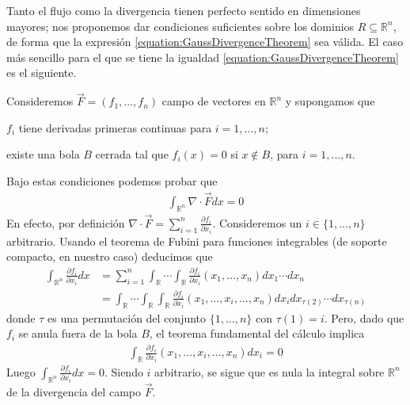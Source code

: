 \documentclass{report}
\newcommand{\realNumbers}{\mathbb{R}}
\theoremstyle{definition}
\theoremstyle{remark}
\begin{document}
  Tanto el flujo como la divergencia tienen perfecto sentido en dimensiones mayores;
  nos proponemos dar condiciones suficientes sobre los dominios \(R \subseteq \realNumbers^n\), de forma que la expresión \eqref{equation:GaussDivergenceTheorem} sea válida.
  El caso más sencillo para el que se tiene la igualdad \eqref{equation:GaussDivergenceTheorem} es el siguiente.

  Consideremos \(\vec{F} = (f_1, \dots, f_n)\) campo de vectores en \(\realNumbers^n\) y supongamos que
  \begin{enumerate*}
    \item \(f_i\) tiene derivadas primeras continuas para \(i = 1, \dots, n\);
    \item existe una bola \(B\) cerrada tal que \(f_i(x) = 0\) si \(x \notin B\), para \(i = 1, \dots, n\).
  \end{enumerate*}
  Bajo estas condiciones podemos probar que 
  \begin{align}
    \label{equation:compactlySupportedFieldsHaveNullTotalDivergence}
    \int_{\realNumbers^n} \nabla \cdot \vec{F} dx = 0
  \end{align}
  En efecto, por definición
  \(
    \nabla \cdot \vec{F}
    =
    \sum_{i = 1}^n
    \frac{\partial f_i}{\partial x_i}
  \).
  Consideremos un \(i \in \{1, \dots, n\}\) arbitrario.
  Usando el teorema de Fubini para funciones integrables (de soporte compacto, en nuestro caso) deducimos que
  \begin{align}
    \int_{\realNumbers^n} \frac{\partial f_i}{\partial x_i} dx
    &=
    \sum_{i = 1}^n
    \int_{\realNumbers} \cdots \int_{\realNumbers}
      \frac{\partial f_i}{\partial x_i}(x_1, \dots, x_n)
    dx_1 \cdots dx_n
    \\
    \label{equation:integralsCanBePermutedBecauseOfCompactSupport}
    &=
    \int_{\realNumbers} \cdots \int_{\realNumbers} \int_{\realNumbers}
      \frac{\partial f_i}{\partial x_i}(x_1, \dots, x_i, \dots, x_n)
    dx_{i} dx_{\tau(2)} \cdots dx_{\tau(n)}
  \end{align}
  donde \(\tau\) es una permutación del conjunto \(\{1, \dots, n\}\) con \(\tau(1) = i\).
  Pero, dado que \(f_i\) se anula fuera de la bola \(B\), el teorema fundamental del cálculo implica
  \begin{align}
    \label{equation:integralIsNullBecauseOfCompactSupport}
    \int_{\realNumbers}
      \frac{\partial f_i}{\partial x_i}(x_1, \dots, x_i, \dots, x_n)
    dx_{i}
    =
    0
  \end{align}
  Luego \(\int_{\realNumbers^n} \frac{\partial f_i}{\partial x_i} dx = 0\).
  Siendo \(i\) arbitrario, se sigue que es nula la integral sobre \(\realNumbers^n\) de la divergencia del campo \(\vec{F}\).
  
\end{document}
